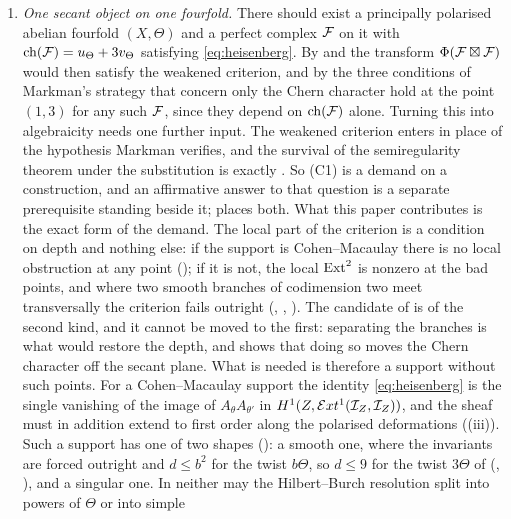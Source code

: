 \begin{enumerate}[label=\textup{(C\arabic*)},leftmargin=3.0em,itemsep=4pt]
\item \emph{One secant object on one fourfold.} There should exist a
  principally polarised abelian fourfold $(X,\Theta)$ and a perfect complex
  $\mathcal{F}$ on it with $\operatorname{ch}(\mathcal{F})=u_{\Theta}+3v_{\Theta}$ satisfying
  \eqref{eq:heisenberg}. By  and 
  the transform $\Phi(\mathcal{F}\boxtimes\mathcal{F})$ would then satisfy the weakened
  criterion, and by  the three conditions of Markman's
  strategy that concern only the Chern character hold at the point $(1,3)$
  for any such $\mathcal{F}$, since they depend on $\operatorname{ch}(\mathcal{F})$ alone. Turning this
  into algebraicity needs one further input. The weakened criterion enters
  in place of the hypothesis Markman verifies, and the survival of the
  semiregularity theorem under the substitution is exactly
  \cite[Question 11.4]{Mar25b}. So (C1) is a demand on a construction, and an affirmative answer to
  that question is a separate prerequisite standing beside it;
   places both. What this paper contributes is the exact
  form of the demand. The local part of the criterion is a condition on depth
  and nothing else: if the support is Cohen--Macaulay there is no local
  obstruction at any point (); if it is not, the local
  $\operatorname{Ext}^{2}$ is nonzero at the bad points, and where two smooth branches of
  codimension two meet transversally the criterion fails outright
  (, ,
  ). The candidate of
  \cite[Section 12]{Mar25b} is of the second kind, and it cannot be moved to
  the first: separating the branches is what would restore the depth, and
   shows that doing so moves the Chern character
  off the secant plane. What is needed is therefore a support without such
  points. For a Cohen--Macaulay support the identity \eqref{eq:heisenberg}
  is the single vanishing of the image of $A_{\theta}A_{\theta'}$ in
  $H^{1}(Z,\mathcal{E} xt^{1}(\mathcal{I}_{Z},\mathcal{I}_{Z}))$, and the sheaf must in addition
  extend to first order along the polarised deformations
  ((iii)). Such a support has one of two
  shapes (): a smooth one, where the invariants are forced
  outright and $d\le b^{2}$ for the twist $b\Theta$, so $d\le9$ for the twist
  $3\Theta$ of  (,
  ), and a singular one. In neither may the
  Hilbert--Burch resolution split into powers of $\Theta$ or into simple

\end{enumerate}
